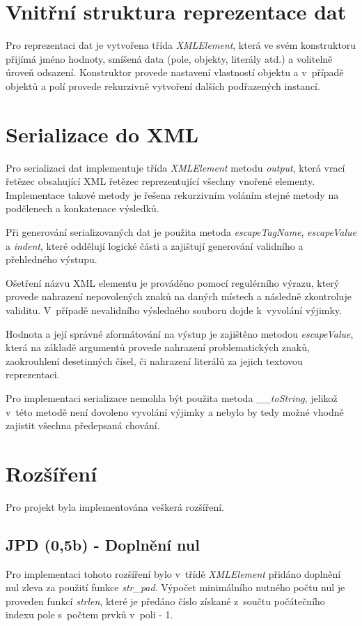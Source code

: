 \documentclass[10pt,a4paper]{article}
\begin{document}
\section{Vnitřní struktura reprezentace dat}
	Pro reprezentaci dat je vytvořena třída \textit{XMLElement}, která ve svém konstruktoru přijímá jméno hodnoty, smíšená data (pole, objekty, literály atd.) a volitelně úroveň odsazení. Konstruktor provede nastavení vlastností objektu a v~případě objektů a polí provede rekurzivně vytvoření dalších podřazených instancí.
	
\section{Serializace do XML}
	Pro serializaci dat implementuje třída \textit{XMLElement} metodu \textit{output}, která vrací řetězec obsahující XML řetězec reprezentující všechny vnořené elementy. Implementace takové metody je řešena rekurzivním voláním stejné metody na podčlenech a konkatenace výsledků.
	
	Při generování serializovaných dat je použita metoda \textit{escapeTagName}, \textit{escapeValue} a \textit{indent}, které oddělují logické části a zajištují generování validního a přehledného výstupu.
	
	Ošetření názvu XML elementu je prováděno pomocí regulérního výrazu, který provede nahrazení nepovolených znaků na daných místech a následně zkontroluje validitu. V~případě nevalidního výsledného souboru dojde k~vyvolání výjimky.
	
	Hodnota a její správné zformátování na výstup je zajištěno metodou \textit{escapeValue}, která na základě argumentů provede nahrazení problematických znaků, zaokrouhlení desetinných čísel, či nahrazení literálů za jejich textovou reprezentaci.
	
	Pro implementaci serializace nemohla být použita metoda \textit{\_\_toString}, jelikož v~této metodě není dovoleno vyvolání výjimky a nebylo by tedy možné vhodně zajistit všechna předepsaná chování.
	
\section{Rozšíření}
	Pro projekt byla implementována veškerá rozšíření.

	\subsection{JPD (0,5b) - Doplnění nul}
		Pro implementaci tohoto rozšíření bylo v~třídě \textit{XMLElement} přidáno doplnění nul zleva za použití funkce \textit{str\_pad}. Výpočet minimálního nutného počtu nul je proveden funkcí \textit{strlen}, které je předáno číslo získané z~součtu počátečního indexu pole s~počtem prvků v~poli - 1.
		
\end{document}
